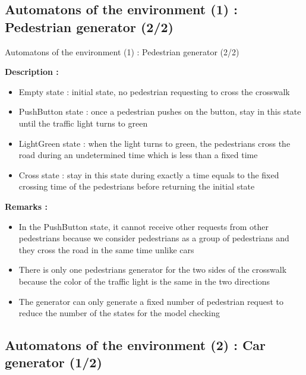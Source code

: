 \documentclass{bredelebeamer}
\begin{document}
\subsection{Automatons of the environment (1) : Pedestrian generator (2/2)}

\begin{frame}{Automatons of the environment (1) : Pedestrian generator (2/2)}


\textbf{Description : }


\begin{itemize}

\item Empty state : initial state, no pedestrian requesting to cross the crosswalk

\item PushButton state : once a pedestrian pushes on the button, stay in this state until the traffic light turns to green

\item LightGreen state : when the light turns to green, the pedestrians cross the road during an undetermined time which is less than a fixed time

\item Cross state : stay in this state during exactly a time equals to the fixed crossing time of the pedestrians before returning the initial state

\end{itemize}


\textbf{Remarks : }


\begin{itemize}

\item In the PushButton state, it cannot receive other requests from other pedestrians because we consider pedestrians as a group of pedestrians and they cross the road in the same time unlike cars

\item There is only one pedestrians generator for the two sides of the crosswalk because the color of the traffic light is the same in the two directions

\item The generator can only generate a fixed number of pedestrian request to reduce the number of the states for the model checking

\end{itemize}


\end{frame}


\subsection{Automatons of the environment (2) : Car generator (1/2)}
\end{document}
